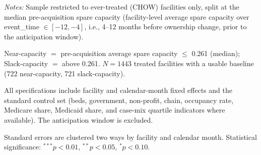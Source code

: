 \begin{table}[!ht]
\begin{threeparttable}
\begin{tablenotes}[flushleft]
\footnotesize
\item \textit{Notes:} Sample restricted to ever-treated (CHOW) facilities only, split at the median pre-acquisition spare capacity (facility-level average spare capacity over event\_time $\in [-12,-4]$, i.e., 4--12 months before ownership change, prior to the anticipation window).
\item Near-capacity $=$ pre-acquisition average spare capacity $\leq$ 0.261 (median); Slack-capacity $=$ above 0.261. $N = 1443$ treated facilities with a usable baseline (722 near-capacity, 721 slack-capacity).
\item All specifications include facility and calendar-month fixed effects and the standard control set (beds, government, non-profit, chain, occupancy rate, Medicare share, Medicaid share, and case-mix quartile indicators where available). The anticipation window is excluded.
\item Standard errors are clustered two ways by facility and calendar month. Statistical significance: $^{***}p<0.01$, $^{**}p<0.05$, $^{*}p<0.10$.
\end{tablenotes}
\end{threeparttable}
\end{table}
\endgroup

